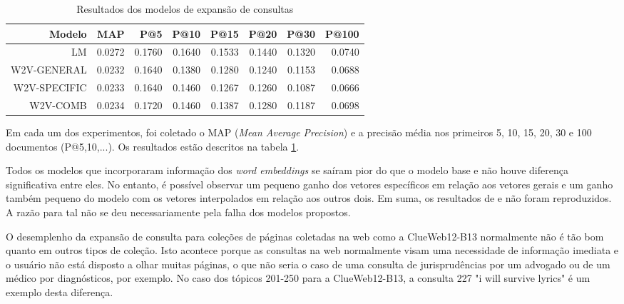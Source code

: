 \documentclass{article}
\begin{document}
\begin{center}
  \begin{table}
  \centering
  \begin{tabular}{ | r r r r r r r r | }
    \hline
    Modelo & MAP & P@5 & P@10 & P@15 & P@20 & P@30 & P@100 \\
    \hline
    LM & 0.0272 & 0.1760 & 0.1640 & 0.1533 & 0.1440 & 0.1320 & 0.0740 \\
    W2V-GENERAL & 0.0232 & 0.1640 & 0.1380 & 0.1280 & 0.1240 & 0.1153 & 0.0688 \\
    W2V-SPECIFIC & 0.0233 & 0.1640 & 0.1460 & 0.1267 & 0.1260 & 0.1087 & 0.0666 \\
    W2V-COMB & 0.0234 & 0.1720 & 0.1460 & 0.1387 & 0.1280 & 0.1187 & 0.0698 \\
    \hline
  \end{tabular}
  \caption{Resultados dos modelos de expansão de consultas}
  \label{tab:experiments}
  \end{table}
\end{center}

Em cada um dos experimentos, foi coletado o MAP (\textit{Mean Average Precision}) e a precisão média nos 
primeiros 5, 10, 15, 20, 30 e 100 documentos (P@5,10,...). Os resultados estão descritos na tabela \ref{tab:experiments}.

Todos os modelos que incorporaram informação dos \textit{word embeddings} se saíram pior do que o
modelo base e não houve diferença significativa entre eles. No entanto, é possível observar um pequeno ganho
dos vetores específicos em relação aos vetores gerais e um ganho também pequeno do modelo com os vetores interpolados
em relação aos outros dois. Em suma, os resultados de \cite{kuzi2016} e \cite{diaz2016} não foram reproduzidos. A razão 
para tal não se deu necessariamente pela falha dos modelos propostos.

O desemplenho da expansão de consulta para coleções de páginas coletadas na web como a ClueWeb12-B13 normalmente
não é tão bom quanto em outros tipos de coleção. Isto acontece porque as consultas na web normalmente visam uma
necessidade de informação imediata e o usuário não está disposto a olhar muitas páginas, o que não seria o caso
de uma consulta de jurisprudências por um advogado ou de um médico por diagnósticos, por exemplo. No caso dos tópicos
201-250 para a ClueWeb12-B13, a consulta 227 "i will survive lyrics" é um exemplo desta diferença.
\end{document}
